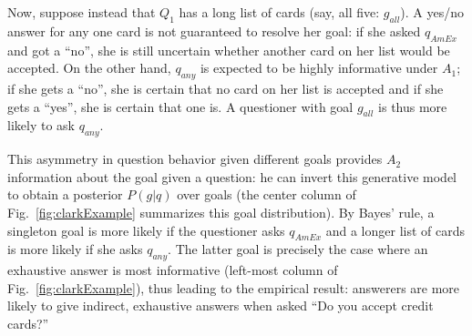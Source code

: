 \documentclass[11pt, floatsintext]{apa6}
\begin{document}


Now, suppose instead that $Q_1$ has a long list of cards (say, all five: $g_{all}$). A yes/no answer for any one card is not guaranteed to resolve her goal: if she asked $q_{AmEx}$ and got a ``no'', she is still uncertain whether another card on her list would be accepted. On the other hand, $q_{any}$ is expected to be highly informative under $A_1$; if she gets a ``no'', she is certain that no card on her list is accepted and if she gets a ``yes'', she is certain that one is. A questioner with goal $g_{all}$ is thus more likely to ask $q_{any}$.

This asymmetry in question behavior given different goals provides $A_2$ information about the goal given a question: he can invert this generative model to obtain a posterior $P(g | q)$ over goals (the center column of Fig.~\ref{fig:clarkExample} summarizes this goal distribution). By Bayes' rule, a singleton goal is more likely if the questioner asks $q_{AmEx}$ and a longer list of cards is more likely if she asks $q_{any}$. The latter goal is precisely the case where an exhaustive answer is most informative (left-most column of Fig.~\ref{fig:clarkExample}), thus leading to the empirical result: answerers are more likely to give indirect, exhaustive answers when asked ``Do you accept credit cards?'' 


\end{document}
